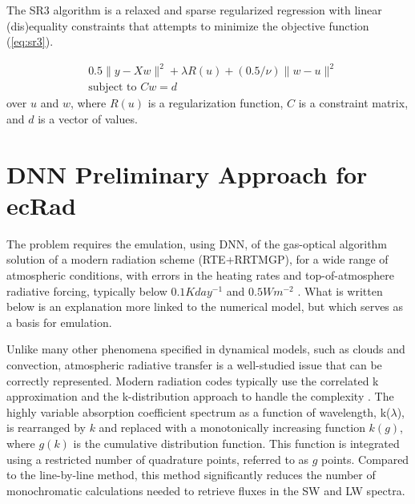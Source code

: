 The SR3 algorithm \cite{Champion2019} is a relaxed and sparse regularized regression with linear (dis)equality constraints that attempts to minimize the objective function (\autoref{eq:sr3}).

\begin{minipage}[htb]{.95\columnwidth}\bigskip\begin{equation}\begin{aligned}
&0.5  \|  y  -  X  w \|^2 + \lambda  R(u) + (0.5 / \nu)  \|  w  -  u  \|^2\\
&\text{subject to } Cw = d
\label{eq:sr3}\end{aligned}\end{equation}
over $u$ and $w$, where $R(u)$ is a regularization function, $C$ is a constraint matrix, and $d$ is a vector of values.
\bigskip\end{minipage}%


\section{DNN Preliminary Approach for ecRad}
\label{sec:mcw}

The problem requires the emulation, using DNN, of the gas-optical algorithm solution of a modern radiation scheme (RTE+RRTMGP), for a wide range of atmospheric conditions, with errors in the heating rates and top-of-atmosphere radiative forcing, typically below $0.1 K day^{-1}$ and $0.5 W m^{-2}$ \cite{Ukkonen2020}.
What is written below is an explanation more linked to the numerical model, but which serves as a basis for emulation. 

Unlike many other phenomena specified in dynamical models, such as clouds and convection, atmospheric radiative transfer is a well-studied issue that can be correctly represented. Modern radiation codes typically use the correlated k approximation and the k-distribution approach to handle the complexity \cite{Goody1989}. The highly variable absorption coefficient spectrum as a function of wavelength, k($\lambda$), is rearranged by $k$ and replaced with a monotonically increasing function $k(g)$, where $g(k)$ is the cumulative distribution function. This function is integrated using a restricted number of quadrature points, referred to as $g$ points. Compared to the line-by-line method, this method significantly reduces the number of monochromatic calculations needed to retrieve fluxes in the SW and LW spectra. 

